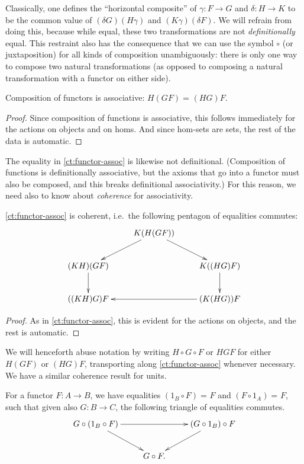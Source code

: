 \documentclass{mscs}
\newcommand{\id}[3][]{\ensuremath{#2 =_{#1} #3}\xspace}
\numberwithin{equation}{section}
\begin{document}
Classically, one defines the ``horizontal composite'' of $\gamma:F\to G$ and $\delta:H\to K$ to be the common value of ${(\delta G)(H\gamma)}$ and ${(K\gamma)(\delta F)}$.
We will refrain from doing this, because while equal, these two transformations are not \emph{definitionally} equal.
This restraint also has the consequence that we can use the symbol $\circ$ (or juxtaposition) for all kinds of composition unambiguously: there is only one way to compose two natural transformations (as opposed to composing a natural transformation with a functor on either side).

\begin{lem}\label{ct:functor-assoc}
  Composition of functors is associative: $\id{H(GF)}{(HG)F}$.
\end{lem}
\begin{proof}
  Since composition of functions is associative, this follows immediately for the actions on objects and on homs.
  And since hom-sets are sets, the rest of the data is automatic.
\end{proof}

The equality in \autoref{ct:functor-assoc} is likewise not definitional.
(Composition of functions is definitionally associative, but the axioms that go into a functor must also be composed, and this breaks definitional associativity.)  For this reason, we need also to know about \emph{coherence} for associativity.

\begin{lem}\label{ct:pentagon}
  \autoref{ct:functor-assoc} is coherent, i.e.\ the following pentagon of equalities commutes:
  \[ \xymatrix{ & K(H(GF)) \ar[dl] \ar[dr]\\
    (KH)(GF) \ar[d] && K((HG)F) \ar[d]\\
    ((KH)G)F && (K(HG))F \ar[ll] }
  \]
\end{lem}
\begin{proof}
  As in \autoref{ct:functor-assoc}, this is evident for the actions on objects, and the rest is automatic.
\end{proof}

We will henceforth abuse notation by writing $H\circ G\circ F$ or $HGF$ for either $H(GF)$ or $(HG)F$, transporting along \autoref{ct:functor-assoc} whenever necessary.
We have a similar coherence result for units.

\begin{lem}\label{ct:units}
  For a functor $F:A\to B$, we have equalities $\id{(1_B\circ F)}{F}$ and $\id{(F\circ 1_A)}{F}$, such that given also $G:B\to C$, the following triangle of equalities commutes.
  \[ \xymatrix{
    G\circ (1_B \circ F) \ar[rr] \ar[dr] &&
    (G\circ 1_B)\circ F \ar[dl] \\
    & G \circ F.}
  \]
\end{lem}
\end{document}
